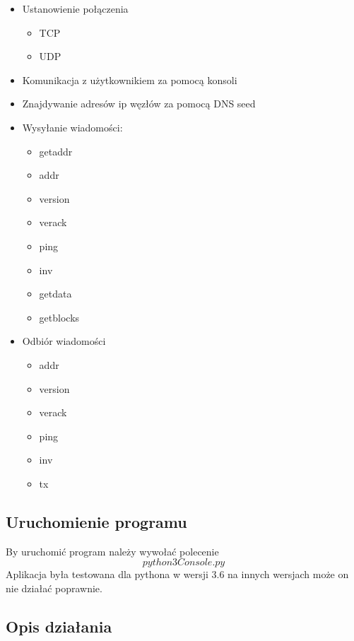 \documentclass[a4paper,polish,12pt]{article}
\begin{document}
\begin{itemize}


\item Ustanowienie połączenia
\begin{itemize}
\item TCP
\item UDP
\end{itemize}

\item Komunikacja z użytkownikiem za pomocą konsoli
\item Znajdywanie adresów ip węzłów za pomocą DNS seed
\item Wysyłanie wiadomości:
\begin{itemize}
\item getaddr
\item addr
\item version
\item verack
\item ping
\item inv
\item getdata
\item getblocks
\end{itemize} 
\item Odbiór wiadomości
\begin{itemize}
\item addr
\item version
\item verack
\item ping
\item inv
\item tx

\end{itemize}
\end{itemize}
\subsection{Uruchomienie programu}
\label{chap:1}
By uruchomić program należy wywołać polecenie $$python3 Console.py$$
Aplikacja była testowana dla pythona w wersji 3.6 na innych wersjach może on nie działać poprawnie.
\subsection{Opis działania}
\end{document}
